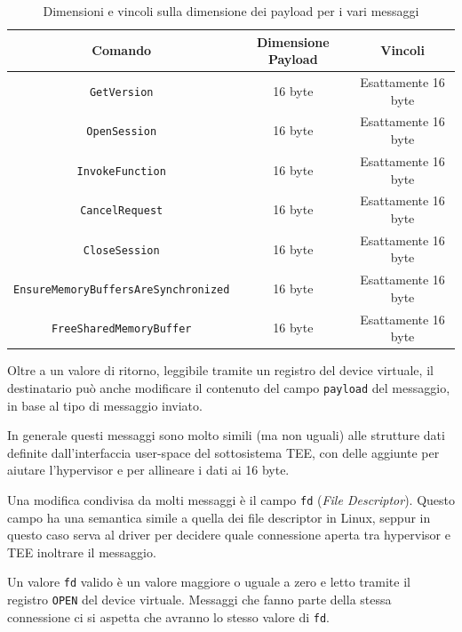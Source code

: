 \documentclass[12pt,italian]{report}
\begin{document}
\begin{table}
    \centering
    \begin{tabular}{|c|c|c|}
        \hline
        \textbf{Comando}    & \textbf{Dimensione Payload} & \textbf{Vincoli}    \\
        \hline
        \texttt{GetVersion} & 16 byte                     & Esattamente 16 byte \\
        \texttt{OpenSession} & 16 byte                     & Esattamente 16 byte \\
        \texttt{InvokeFunction} & 16 byte                     & Esattamente 16 byte \\
        \texttt{CancelRequest} & 16 byte                     & Esattamente 16 byte \\
        \texttt{CloseSession} & 16 byte                     & Esattamente 16 byte \\
        \texttt{EnsureMemoryBuffersAreSynchronized} & 16 byte                     & Esattamente 16 byte \\
        \texttt{FreeSharedMemoryBuffer} & 16 byte                     & Esattamente 16 byte \\
        \hline
    \end{tabular}
    \caption{
        Dimensioni e vincoli sulla dimensione dei payload per i vari messaggi
    }
    \label{tab:dimensioni-valide-payload}
\end{table}

Oltre a un valore di ritorno, leggibile tramite un registro del device
virtuale, il destinatario può anche modificare il contenuto del campo
\texttt{payload} del messaggio, in base al tipo di messaggio inviato.

In generale questi messaggi sono molto simili (ma non uguali) alle strutture
dati definite dall'interfaccia user-space del sottosistema TEE, con delle
aggiunte per aiutare l'hypervisor e per allineare i dati ai 16 byte.

Una modifica condivisa da molti messaggi è il campo \texttt{fd}
(\textit{File Descriptor}). Questo campo ha una semantica simile a quella
dei file descriptor in Linux, seppur in questo caso serva al driver per decidere
quale connessione aperta tra hypervisor e TEE inoltrare il messaggio.

Un valore \texttt{fd} valido è un valore maggiore o uguale a zero e letto
tramite il registro \texttt{OPEN} del device virtuale.
Messaggi che fanno parte della stessa connessione ci si aspetta che avranno
lo stesso valore di \texttt{fd}.
\end{document}
